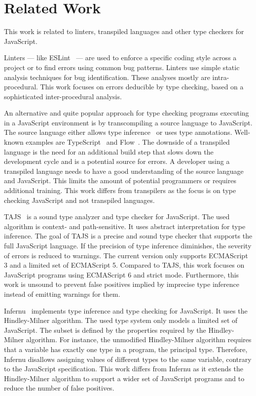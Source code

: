 \section{Related Work}\label{sec:related-work}
This work is related to linters, transpiled languages and other type checkers for JavaScript. 

Linters --- like ESLint~\cite{jQuery2016}  --- are used to enforce a specific coding style across a project or to find errors using common bug patterns. Linters use simple static analysis techniques for bug identification. These analyses mostly are intra-procedural. This work focuses on errors deducible by type checking, based on a sophisticated inter-procedural analysis. 


An alternative and quite popular approach for type checking programs executing in a JavaScript environment is by transcompiling a source language to JavaScript. The source language either allows type inference~\cite{Ekblad2012, McKenna} or uses type annotations. Well-known examples are TypeScript~\cite{Microsoft2012} and Flow~\cite{Facebook2014}. The downside of a transpiled language is the need for an additional build step that slows down the development cycle and is a potential source for errors. A developer using a transpiled language needs to have a good understanding of the source language and JavaScript. This limits the amount of potential programmers or requires additional training. This work differs from transpilers as the focus is on type checking JavaScript and not transpiled languages.

TAJS~\cite{JensenMollerThiemann2009} is a sound type analyzer and type checker for JavaScript. The used algorithm is context- and path-sensitive. It uses abstract interpretation for type inference. The goal of TAJS is a precise and sound type checker that supports the full JavaScript language. If the precision of type inference diminishes, the severity of errors is reduced to warnings. The current version only supports ECMAScript 3 and a limited set of ECMAScript 5. Compared to TAJS, this work focuses on JavaScript programs using ECMAScript 6 and strict mode. Furthermore, this work is unsound to prevent false positives implied by imprecise type inference instead of emitting warnings for them.

Infernu~\cite{Lewis} implements type inference and type checking for JavaScript. It uses the Hindley-Milner algorithm. The used type system only models a limited set of JavaScript. The subset is defined by the properties required by the Hindley-Milner algorithm. For instance, the unmodified Hindley-Milner algorithm requires that a variable has exactly one type in a program, the principal type. Therefore, Infernu disallows assigning values of different types to the same variable, contrary to the JavaScript specification. This work differs from Infernu as it extends the Hindley-Milner algorithm to support a wider set of JavaScript programs and to reduce the number of false positives.

